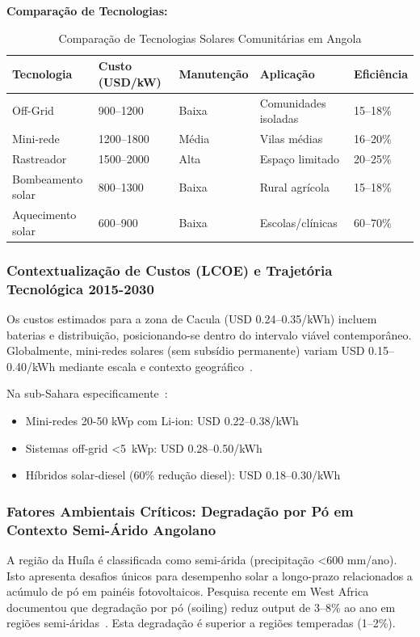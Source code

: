\documentclass[12pt, a4paper]{article}
\begin{document}
\textbf{Comparação de Tecnologias:}

\begin{table}[H]
\centering
\caption{Comparação de Tecnologias Solares Comunitárias em Angola}
\label{Tab:6}
\footnotesize
\begin{tabular}{|l|l|l|l|l|}
\hline
\textbf{Tecnologia} & \textbf{Custo (USD/kW)} & \textbf{Manutenção} & \textbf{Aplicação} & \textbf{Eficiência} \\
\hline
Off-Grid & 900--1200 & Baixa & Comunidades isoladas & 15--18\% \\
Mini-rede & 1200--1800 & Média & Vilas médias & 16--20\% \\
Rastreador & 1500--2000 & Alta & Espaço limitado & 20--25\% \\
Bombeamento solar & 800--1300 & Baixa & Rural agrícola & 15--18\% \\
Aquecimento solar & 600--900 & Baixa & Escolas/clínicas & 60--70\% \\
\hline
\end{tabular}
\end{table}

\subsubsection{Contextualização de Custos (LCOE) e Trajetória Tecnológica 2015-2030}

Os custos estimados para a zona de Cacula (USD 0.24--0.35/kWh) incluem baterias e distribuição, posicionando-se dentro do intervalo viável contemporâneo.
Globalmente, mini-redes solares (sem subsídio permanente) variam USD 0.15--0.40/kWh mediante escala e contexto geográfico~\citep{Ramasamy2022}.

Na sub-Sahara especificamente~\citep{IRENA2022}:
\begin{itemize}
\item Mini-redes 20-50 kWp com Li-ion: USD 0.22--0.38/kWh
\item Sistemas off-grid <5~kWp: USD 0.28--0.50/kWh
\item Híbridos solar-diesel (60\% redução diesel): USD 0.18--0.30/kWh
\end{itemize}

\subsubsection{Fatores Ambientais Críticos: Degradação por Pó em Contexto Semi-Árido Angolano}

A região da Huíla é classificada como semi-árida (precipitação <600 mm/ano).
Isto apresenta desafios únicos para desempenho solar a longo-prazo relacionados a acúmulo de pó em painéis fotovoltaicos.
Pesquisa recente em West Africa documentou que degradação por pó (soiling) reduz output de 3--8\% ao ano em regiões semi-áridas~\citep{Isaacs2025}.
Esta degradação é superior a regiões temperadas (1--2\%).
\end{document}
